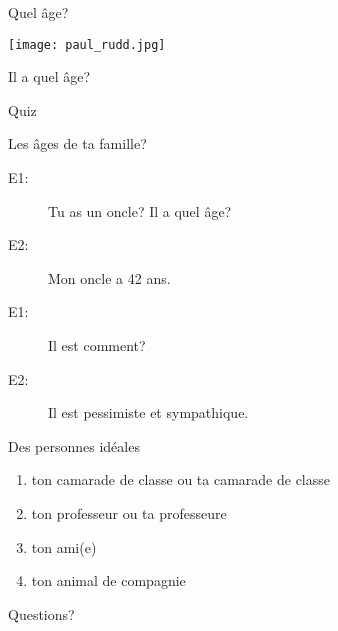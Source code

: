 \documentclass{beamer}
\begin{document}
  \begin{frame}{Quel âge?}
    \begin{center}
      \texttt{[image: paul\_rudd.jpg]}

      Il a quel âge? \underline{}
    \end{center}
  \end{frame}

  \begin{frame}{}
    \begin{center}
      \Large Quiz
    \end{center}
  \end{frame}

  \begin{frame}{Les âges de ta famille?}
    \begin{description}
      \item[E1:] Tu as un oncle? Il a quel âge?
      \item[E2:] Mon oncle a 42 ans.
      \item[E1:] Il est comment?
      \item[E2:] Il est pessimiste et sympathique.
    \end{description}
  \end{frame}

  \begin{frame}{Des personnes idéales}
    \begin{enumerate}
      \item ton camarade de classe ou ta camarade de classe
      \item ton professeur ou ta professeure
      \item ton ami(e)
      \item ton animal de compagnie
    \end{enumerate}
  \end{frame}

  \begin{frame}{}
    \begin{center}
      \Large Questions?
    \end{center}
  \end{frame}
\end{document}
